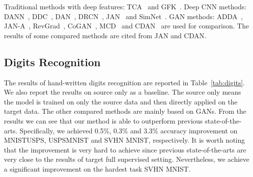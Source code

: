 \documentclass[sigconf]{acmart}
\begin{document}
Traditional methods with deep features: TCA~\cite{pan2011domain} and GFK~\cite{gong2012geodesic}. Deep CNN methods: DANN~\cite{ganin2014unsupervised}, DDC~\cite{tzeng2014deep}, DAN~\cite{long2015learning}, DRCN~\cite{ghifary2016deep}, JAN~\cite{long2017deep} and SimNet~\cite{pinheiro2018unsupervised}. GAN methods: ADDA~\cite{tzeng2017adversarial}, JAN-A~\cite{long2017deep}, RevGrad~\cite{ganin2016domain}, CoGAN~\cite{liu2016coupled}, MCD~\cite{saito2018maximum} and CDAN~\cite{long2018conditional} are used for comparison. The results of some compared methods are cited from JAN and CDAN.



\subsection{Digits Recognition}

\begin{table}[t!p]
\centering
\caption{Results (\%) of digits recognition. The best results are highlighted by bold numbers. The compared methods have the same experimental settings except for UNIT on SVHN MNIST which uses a larger training set. The results of the baselines are cited from corresponding papers.}
\vspace{-8pt}
\label{tab:digits}
\end{table}

The results of hand-written digits recognition are reported in Table~\ref{tab:digits}. We also report the results on source only as a baseline. The source only means the model is trained on only the source data and then directly applied on the target data. The other compared methods are mainly based on GANs. From the results we can see that our method is able to outperform previous state-of-the-arts. Specifically, we achieved 0.5\%, 0.3\% and 3.3\% accuracy improvement on MNISTUSPS, USPSMNIST and SVHN MNIST, respectively. It is worth noting that the improvement is very hard to achieve since previous state-of-the-arts are very close to the results of target full supervised setting. Nevertheless, we achieve a significant improvement on the hardest task SVHN MNIST.
\end{document}
